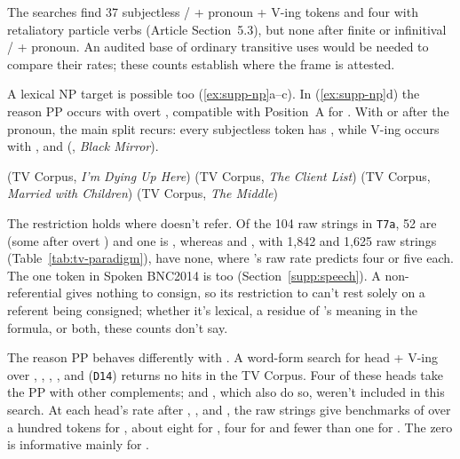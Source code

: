 \documentclass[12pt]{article}
\begin{document}
The searches find 37 subjectless / + pronoun +  V-ing tokens and four with retaliatory particle verbs (Article Section~5.3), but none after finite or infinitival / + pronoun. An audited base of ordinary transitive uses would be needed to compare their rates; these counts establish where the frame is attested.

A lexical NP target is possible too (\ref{ex:supp-np}a--c). In (\ref{ex:supp-np}d) the reason PP occurs with overt , compatible with Position~A for . With  or  after the pronoun, the main split recurs: every subjectless  token has , while  V-ing occurs with ,  and  (, \emph{Black Mirror}).

\ea\label{ex:supp-np}
\ea {} \hfill (TV Corpus, \emph{I'm Dying Up Here})
\ex {} \hfill (TV Corpus, \emph{The Client List})
\ex {} \hfill (TV Corpus, \emph{Married with Children})
\ex {} \hfill (TV Corpus, \emph{The Middle})
\z
\z



The restriction holds where  doesn't refer. Of the 104 raw  strings in \texttt{T7a}, 52 are  (some after overt ) and one is , whereas  and , with 1,842 and 1,625 raw strings (Table~\ref{tab:tv-paradigm}), have none, where 's raw rate predicts four or five each. The one  token in Spoken BNC2014 is  too (Section~\ref{supp:speech}). A non-referential  gives  nothing to consign, so its restriction to  can't rest solely on a referent being consigned; whether it's lexical, a residue of 's meaning in the formula, or both, these counts don't say.

The reason PP behaves differently with . A word-form search for head +  V-ing over , , , ,  and  (\texttt{D14}) returns no hits in the TV Corpus. Four of these heads take the PP with other complements;  and , which also do so, weren't included in this search. At each head's rate after , ,  and , the raw strings give benchmarks of over a hundred tokens for , about eight for , four for  and fewer than one for . The zero is informative mainly for .
\end{document}
